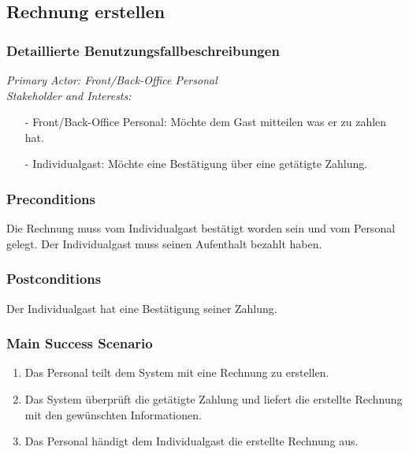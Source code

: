 \documentclass[./detailed_overview_usecases.tex]{subfiles}
\begin{document}
    \subsection{Rechnung erstellen}
    \subsubsection{Detaillierte Benutzungsfallbeschreibungen}
    \textit{Primary Actor: Front/Back-Office Personal}
    \\
    \textit{Stakeholder and Interests:}
    \begin{itemize}
        \item[-] Front/Back-Office Personal: Möchte dem Gast mitteilen was er zu zahlen hat.
        \item[-] Individualgast: Möchte eine Bestätigung über eine getätigte Zahlung.
    \end{itemize}

    \subsubsection*{Preconditions}
    Die Rechnung muss vom Individualgast bestätigt worden sein und vom Personal gelegt. Der Individualgast muss seinen Aufenthalt bezahlt haben.

    \subsubsection*{Postconditions}
    Der Individualgast hat eine Bestätigung seiner Zahlung.

    \subsubsection*{Main Success Scenario}
    \begin{enumerate}
        \item Das Personal teilt dem System mit eine Rechnung zu erstellen.
        \item Das System überprüft die getätigte Zahlung und liefert die erstellte Rechnung mit den gewünschten Informationen.
        \item Das Personal händigt dem Individualgast die erstellte Rechnung aus.
    \end{enumerate}
\end{document}
